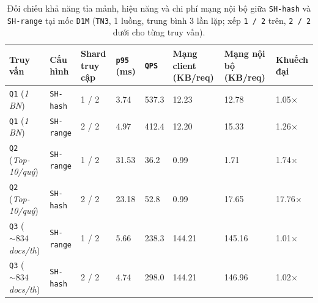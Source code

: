 \begin{table}[!htb]
\centering
\caption{Đối chiếu khả năng tỉa mảnh, hiệu năng và chi phí mạng nội bộ giữa \texttt{SH-hash} và \texttt{SH-range} tại mốc \texttt{D1M} (\texttt{TN3}, 1 luồng, trung bình 3 lần lặp; xếp \texttt{1 / 2} trên, \texttt{2 / 2} dưới cho từng truy vấn).}
\label{tab:rq3-results}
\renewcommand{\arraystretch}{1.2}
\setlength{\tabcolsep}{4pt}
\footnotesize
\begin{tabularx}{\linewidth}{>{\raggedright\arraybackslash}X l C{1.2cm} R{1.35cm} R{1.2cm} R{1.95cm} R{1.95cm} C{1.35cm}}
\toprule
\textbf{Truy vấn} & \textbf{Cấu hình} & \textbf{Shard truy cập} & \textbf{\texttt{p95} (ms)} & \textbf{\texttt{QPS}} & \textbf{Mạng client (KB/req)} & \textbf{Mạng nội bộ (KB/req)} & \textbf{Khuếch đại} \\
\midrule
\texttt{Q1} (\textit{1 BN}) & \texttt{SH-hash} & 1 / 2 & 3.74 & 537.3 & 12.23 & 12.78 & 1.05$\times$ \\
\texttt{Q1} (\textit{1 BN}) & \texttt{SH-range} & 2 / 2 & 4.97 & 412.4 & 12.20 & 15.33 & 1.26$\times$ \\
\midrule
\texttt{Q2} (\textit{Top-10/quý}) & \texttt{SH-range} & 1 / 2 & 31.53 & 36.2 & 0.99 & 1.71 & 1.74$\times$ \\
\texttt{Q2} (\textit{Top-10/quý}) & \texttt{SH-hash} & 2 / 2 & 23.18 & 52.8 & 0.99 & 17.65 & 17.76$\times$ \\
\midrule
\texttt{Q3} (\textit{$\sim 834$ docs/th}) & \texttt{SH-range} & 1 / 2 & 5.66 & 238.3 & 144.21 & 145.16 & 1.01$\times$ \\
\texttt{Q3} (\textit{$\sim 834$ docs/th}) & \texttt{SH-hash} & 2 / 2 & 4.74 & 298.0 & 144.21 & 146.96 & 1.02$\times$ \\
\bottomrule
\end{tabularx}
\end{table}


